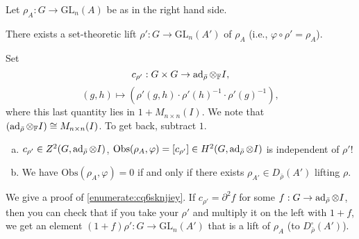 \documentclass[reqno]{amsart} 
\begin{document}
Let $\rho_A : G \rightarrow \mathrm{GL}_n(A)$ be as in the right hand side.
\begin{fact}\label{fact:cq6thpec2o}
  There exists a set-theoretic lift $\rho ' : G \rightarrow \mathrm{GL}_n(A')$ of $\rho_A$ (i.e., $\varphi \circ \rho ' = \rho_A$).
\end{fact}
\begin{definition}\label{definition:cq6thpeaqx}
  Set
  \begin{equation*}
    c_{\rho '} : G \times G \rightarrow \operatorname{ad}_{\bar{\rho}} \otimes_{\mathbb{F}} I,
  \end{equation*}
  \begin{equation*}
    (g, h) \mapsto(\rho '(g, h) \cdot \rho '(h)^{-1} \cdot \rho '(g)^{-1}),
  \end{equation*}
  where this last quantity lies in $1 + M_{n \times n}(I)$.  We note that $(\operatorname{ad}_{\bar{\rho}} \otimes_{\mathbb{F}} I) \cong M_{n \times n}(I)$.  To get back, subtract $1$.
\end{definition}
\begin{proposition}\label{proposition:cq6thpd7zv}
  \begin{enumerate}[(a)]
  \item\label{enumerate:cq6sknji3b} $c_{\rho '} \in Z^2(G, \operatorname{ad}_{\bar{\rho}} \otimes I)$, $\mathrm{Obs}(\rho_A, \varphi) =[ c_{\rho '} ] \in H^2(G, \operatorname{ad}_{\bar{\rho}} \otimes I)$ is independent of $\rho '$!
  \item\label{enumerate:cq6sknjiey} We have $\mathrm{Obs}(\rho_A, \varphi) = 0$ if and only if there exists $\rho_{A'} \in D_{\bar{\rho}}(A')$ lifting $\rho$.
  \end{enumerate}
\end{proposition}
We give a proof of \eqref{enumerate:cq6sknjiey}.  If $c_{\rho '} = \partial^2 f$ for some $f : G \rightarrow \operatorname{ad}_{\bar{\rho}} \otimes I$, then you can check that if you take your $\rho '$ and multiply it on the left with $1 + f$, we get an element $(1 + f) \rho ' : G \rightarrow \mathrm{GL}_n(A')$ that is a lift of $\rho_A$ (to $D_{\bar{\rho}}^{\square}(A')$).
\end{document}
